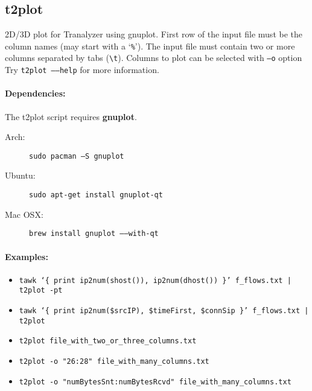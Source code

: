 \documentclass[documentation]{subfiles}
\begin{document}
\subsection{t2plot}\label{t2plot}
2D/3D plot for Tranalyzer using gnuplot.
First row of the input file must be the column names (may start with a `{\tt \%}').
The input file must contain two or more columns separated by tabs ({\tt \textbackslash{}t}).
Columns to plot can be selected with {\tt --o} option
Try {\tt t2plot --{}--help} for more information.

\paragraph{Dependencies:}
The t2plot script requires {\bf gnuplot}.
\begin{description}
    \item[Arch:] {\tt sudo pacman --S gnuplot}
    \item[Ubuntu:] {\tt sudo apt-get install gnuplot-qt}
    \item[Mac OSX:] {\tt brew install gnuplot --{}--with-qt}
\end{description}

\paragraph{Examples:}
\begin{itemize}
    \item {\tt tawk `\{ print ip2num(shost()), ip2num(dhost()) \}' f\_flows.txt | t2plot -pt}
    \item {\tt tawk `\{ print ip2num(\$srcIP), \$timeFirst, \$connSip \}' f\_flows.txt | t2plot}
    \item {\tt t2plot file\_with\_two\_or\_three\_columns.txt}
    \item {\tt t2plot -o "26:28" file\_with\_many\_columns.txt}
    \item {\tt t2plot -o "numBytesSnt:numBytesRcvd" file\_with\_many\_columns.txt}
\end{itemize}
\end{document}
